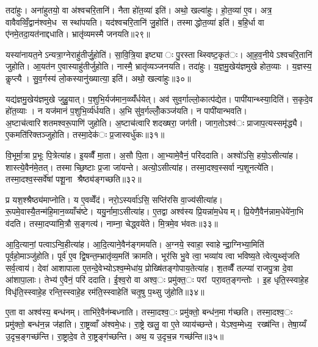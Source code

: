 तदा॑हुः। अना॑हुतयो॒ वा अ॑श्वचरि॒तानि॑। नैता हो॑त॒व्या॑ इति॑। अथो॒ खल्वा॑हुः। हो॒त॒व्या॑ ए॒व। अत्र॒ वावैवव्विँ॒द्वान॑श्वमे॒ध सस्था॑पयति। यद॑श्वचरि॒तानि॑ जु॒होति॑। तस्माद्धोत॒व्या॑ इति॑। ब॒हि॒र्धा वा ए॑नमे॒तदा॒यत॑नाद्दधाति। भ्रातृ॑व्यमस्मै जनयति॥२९॥

यस्या॑नायत॒नेऽन्यत्रा॒ग्नेराहु॑तीर्जु॒होति॑। सा॒वि॒त्रि॒या इष्ट्याः पु॒रस्ताथ्स्विष्ट॒कृत॑ः। आ॒ह॒व॒नीयेऽश्वचरि॒तानि॑ जुहोति। आ॒यत॑न ए॒वास्याहु॑तीर्जुहोति। नास्मै॒ भ्रातृ॑व्यञ्जनयति। तदा॑हुः। य॒ज्ञ॒मु॒खेय॑ज्ञमुखे होत॒व्याः। य॒ज्ञस्य॒ कॢप्त्यै। सु॒व॒र्गस्य॑ लो॒कस्यानु॑ख्यात्या॒ इति॑। अथो॒ खल्वा॑हुः॥३०॥

यद्य॑ज्ञमु॒खेय॑ज्ञमुखे जुहु॒यात्। प॒शुभि॒र्यज॑मान॒व्व्यँ॑र्धयेत्। अव॑ सुव॒र्गाल्लो॒कात्प॑द्येत। पापी॑यान्थ्स्या॒दिति॑। स॒कृदे॒व हो॑त॒व्याः। न यज॑मानं प॒शुभि॒र्व्य॑र्धयति। अ॒भि सु॑व॒र्गल्लोँ॒कञ्ज॑यति। न पापी॑यान्भवति। अ॒ष्टाच॑त्वारिशतमश्वरू॒पाणि॑ जुहोति। अ॒ष्टाच॑त्वारिशदख्षरा॒ जग॑ती। जाग॒तोऽश्व॑ः प्राजाप॒त्यस्समृ॑द्ध्यै। ए॒कमति॑रिक्तञ्जुहोति। तस्मा॒देक॑ः प्र॒जास्वर्धु॑कः॥३१॥


वि॒भूर्मा॒त्रा प्र॒भूः पि॒त्रेत्या॑ह। इ॒यव्वैँ मा॒ता। अ॒सौ पि॒ता। आ॒भ्यामे॒वैनं॒ परि॑ददाति। अश्वो॑ऽसि॒ हयो॒ऽसीत्या॑ह। शास्त्ये॒वैन॑मे॒तत्। तस्माच्छि॒ष्टाः प्र॒जा जा॑यन्ते। अत्यो॒ऽसीत्या॑ह। तस्मा॒दश्व॒स्सर्वान्प॒शूनत्ये॑ति। तस्मा॒दश्व॒स्सर्वे॑षां पशू॒ना श्रैष्ठ्य॑ङ्गच्छति॥३२॥

प्र यश॒श्श्रैष्ठ्य॑माप्नोति। य ए॒वव्वेँद॑। नरो॒ऽस्यर्वा॑ऽसि॒ सप्ति॑रसि वा॒ज्य॑सीत्या॑ह। रू॒पमे॒वास्यै॒तन्म॑हि॒मान॒व्व्याँच॑ष्टे। ययु॒र्नामा॒ऽसीत्या॑ह। ए॒तद्वा अश्व॑स्य प्रि॒यन्ना॑म॒धेयम्। प्रि॒येणै॒वैन॑न्नाम॒धेये॑ना॒भि व॑दति। तस्मा॒दप्या॑मि॒त्रौ स॒ङ्गत्य॑। नाम्ना॒ चेद्ध्वये॑ते। मि॒त्रमे॒व भ॑वतः॥३३॥

आ॒दि॒त्यानां॒ पत्वाऽन्वि॒हीत्या॑ह। आ॒दि॒त्याने॒वैन॑ङ्गमयति। अ॒ग्नये॒ स्वाहा॒ स्वाहेन्द्रा॒ग्निभ्या॒मिति॑ पूर्वहो॒माञ्जु॑होति। पूर्व॑ ए॒व द्वि॒षन्त॒म्भ्रातृ॑व्य॒मति॑ क्रामति। भूर॑सि भु॒वे त्वा॒ भव्या॑य त्वा भविष्य॒ते त्वेत्युथ्सृ॑जति सर्व॒त्वाय॑। देवा॑ आशापाला ए॒तन्दे॒वेभ्योऽश्व॒म्मेधा॑य॒ प्रोख्षि॑तङ्गोपाय॒तेत्या॑ह। श॒तव्वैँ तल्प्या॑ राजपु॒त्रा दे॒वा आ॑शापा॒लाः। तेभ्य॑ ए॒वैनं॒ परि॑ ददाति। ई॒श्व॒रो वा अश्व॒ः प्रमु॑क्त॒ः परां परा॒वत॒ङ्गन्तोः। इ॒ह धृति॒स्स्वाहे॒ह विधृ॑ति॒स्स्वाहे॒ह रन्ति॒स्स्वाहे॒ह रम॑ति॒स्स्वाहेति॑ चतृ॒षु प॒थ्सु जु॑होति॥३४॥

ए॒ता वा अश्व॑स्य॒ बन्ध॑नम्। ताभि॑रे॒वैन॑म्बध्नाति। तस्मा॒दश्व॒ः प्रमु॑क्तो॒ बन्ध॑न॒मा ग॑च्छति। तस्मा॒दश्व॒ः प्रमु॑क्तो॒ बन्ध॑न॒न्न ज॑हाति। रा॒ष्ट्रव्वाँ अ॑श्वमे॒धः। रा॒ष्ट्रे खलु॒ वा ए॒ते व्याय॑च्छन्ते। येऽश्व॒म्मेध्य॒ रख्ष॑न्ति। तेषा॒य्यँ उ॒दृच॒ङ्गच्छ॑न्ति। रा॒ष्ट्रादे॒व ते रा॒ष्ट्रङ्ग॑च्छन्ति। अथ॒ य उ॒दृच॒न्न गच्छ॑न्ति॥३५॥

